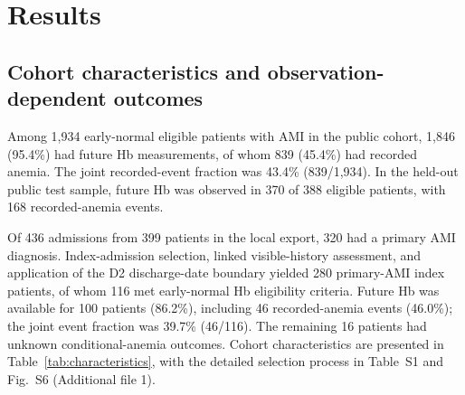 \documentclass[pdflatex,sn-mathphys-num]{sn-jnl}%
\theoremstyle{thmstyleone}%
\theoremstyle{thmstyletwo}%
\theoremstyle{thmstylethree}%
\begin{document}
\section{Results}

\subsection{Cohort characteristics and observation-dependent outcomes}

Among 1,934 early-normal eligible patients with AMI in the public cohort, 1,846 (95.4\%) had future Hb measurements, of whom 839 (45.4\%) had recorded anemia. The joint recorded-event fraction was 43.4\% (839/1,934). In the held-out public test sample, future Hb was observed in 370 of 388 eligible patients, with 168 recorded-anemia events.

Of 436 admissions from 399 patients in the local export, 320 had a primary AMI diagnosis. Index-admission selection, linked visible-history assessment, and application of the D2 discharge-date boundary yielded 280 primary-AMI index patients, of whom 116 met early-normal Hb eligibility criteria. Future Hb was available for 100 patients (86.2\%), including 46 recorded-anemia events (46.0\%); the joint event fraction was 39.7\% (46/116). The remaining 16 patients had unknown conditional-anemia outcomes. Cohort characteristics are presented in Table~\ref{tab:characteristics}, with the detailed selection process in Table~S1 and Fig.~S6 (Additional file 1).
\end{document}
